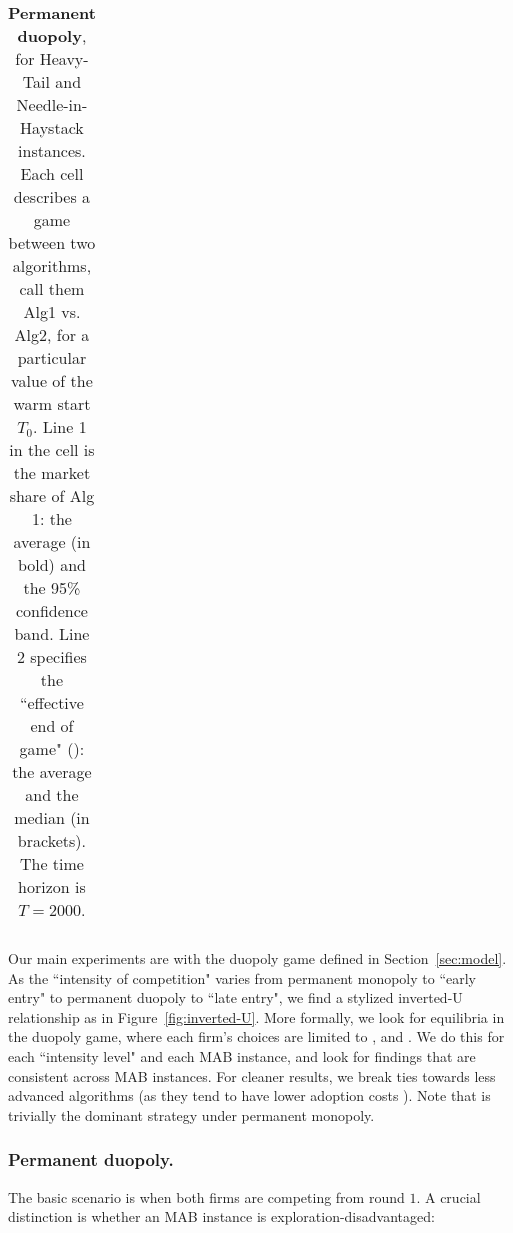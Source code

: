 \documentclass[../competing_bandits.tex]{subfiles}
\begin{document}
\begin{table*}[t]
\begin{tabular}{|c|c|c|c||c|c|c|}
  \\
   \hline
\end{tabular}
\caption{{\bf Permanent duopoly}, for Heavy-Tail and Needle-in-Haystack instances. Each cell describes a game between two algorithms, call them Alg1 vs. Alg2, for a particular value of the warm start $T_0$. Line 1 in the cell is the market share of Alg 1: the average (in bold) and the 95\% confidence band.
Line 2 specifies the ``effective end of game" (\Eeog): the average and the median (in brackets). The time horizon is $T=2000$.}
\label{sim_table}
\end{table*}

Our main experiments are with the duopoly game defined in Section~\ref{sec:model}. As the ``intensity of competition" varies from permanent monopoly to ``early entry" to permanent duopoly to ``late entry", we find a stylized inverted-U relationship as in Figure~\ref{fig:inverted-U}. More formally, we look for equilibria in the duopoly game, where each firm's choices are limited to \DG, \DEG and \TS. We do this for each ``intensity level" and each MAB instance, and look for findings that are consistent across MAB instances. For cleaner results, we break ties towards less advanced algorithms (as they tend to have lower adoption costs \cite{MWT-WhitePaper-2016,DS-arxiv}). Note that \DG is trivially the dominant strategy under permanent monopoly.



\subsubsection{Permanent duopoly.}
The basic scenario is when both firms are competing from round $1$. A crucial distinction is whether an MAB instance is exploration-disadvantaged:
\end{document}

